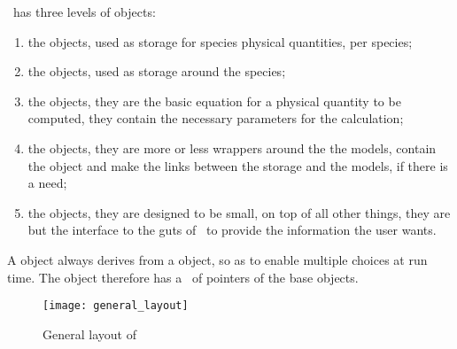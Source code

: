\Antioch\ has three levels of objects:
\begin{enumerate}
\item the  objects, used as storage for species 
        physical quantities, per species;
\item the  objects, used as storage around the
        species;
\item the  objects, they are the basic equation
        for a physical quantity to be computed, they
        contain the necessary parameters for the calculation;
\item the  objects, they are more or less wrappers
        around the the models, contain the  object
        and make the links between the storage and the
        models, if there is a need;
\item the  objects, they are designed to be
        small, on top of all other things, they are but the
        interface to the guts of \Antioch\ to provide
        the information the user wants.
\end{enumerate}

A  object always derives from a 
object, so as to enable multiple choices at run time. The
 object therefore has a \stdvector\ of pointers
of the base objects.

\begin{figure}
\centering
\texttt{[image: general\_layout]}
\caption{\label{Antioch:layout}General layout of \Antioch}
\end{figure}
